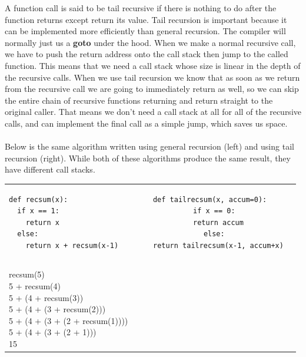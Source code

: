 \documentclass[9pt]{extarticle} %
\begin{document}
%
%
\begin{minipage}[t]{.66\linewidth} %
\vspace{-0.4cm}
\hypertarget{firstnews}{}
	A function call is said to be tail recursive if there is nothing to do after the function returns except return its value. Tail recursion is important because it can be implemented more efficiently than general recursion. The compiler will normally just us a \textbf{goto} under the hood. When we make a normal recursive call, we have to push the return address onto the call stack then jump to the called function. This means that we need a call stack whose size is linear in the depth of the recursive calls. When we use tail recursion we know that as soon as we return from the recursive call we are going to immediately return as well, so we can skip the entire chain of recursive functions returning and return straight to the original caller. That means we don't need a call stack at all for all of the	recursive calls, and can implement the final call as a simple jump, which saves us space. \\
\\
Below is the same algorithm written using general recursion (left) and using tail recursion (right). While both of these algorithms produce the same result, they have different call stacks. \\

\begin{tabular}{ l c r }
\begin{lstlisting}
def recsum(x):
  if x == 1:
    return x
  else:
    return x + recsum(x-1)
\end{lstlisting}
&
\begin{lstlisting}
def tailrecsum(x, accum=0):
  if x == 0:
    return accum
  else:
    return tailrecsum(x-1, accum+x)
\end{lstlisting}
\\
\\
\\
\makecell{
recsum(5) \\
5 + recsum(4) \\
5 + (4 + recsum(3)) \\
5 + (4 + (3 + recsum(2))) \\
5 + (4 + (3 + (2 + recsum(1)))) \\
5 + (4 + (3 + (2 + 1))) \\
15 \\}


\end{tabular}
\end{minipage}
\end{document}
